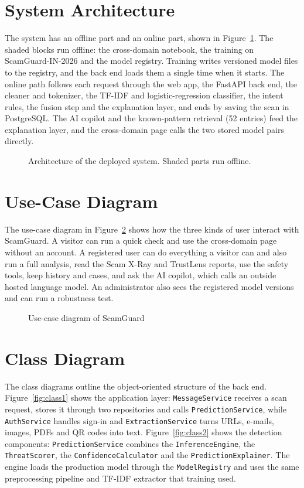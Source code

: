\section{System Architecture}
The system has an offline part and an online part, shown in Figure~\ref{fig:arch}. The shaded blocks run offline: the cross-domain notebook, the training on ScamGuard-IN-2026 and the model registry. Training writes versioned model files to the registry, and the back end loads them a single time when it starts. The online path follows each request through the web app, the FastAPI back end, the cleaner and tokenizer, the TF-IDF and logistic-regression classifier, the intent rules, the fusion step and the explanation layer, and ends by saving the scan in PostgreSQL. The AI copilot and the known-pattern retrieval (52 entries) feed the explanation layer, and the cross-domain page calls the two stored model pairs directly.

\begin{figure}[H]
\centering
\resizebox{\linewidth}{!}{}
\caption{Architecture of the deployed system. Shaded parts run offline.}
\label{fig:arch}
\end{figure}

\section{Use-Case Diagram}
The use-case diagram in Figure~\ref{fig:usecase} shows how the three kinds of user interact with ScamGuard. A visitor can run a quick check and use the cross-domain page without an account. A registered user can do everything a visitor can and also run a full analysis, read the Scam X-Ray and TrustLens reports, use the safety tools, keep history and cases, and ask the AI copilot, which calls an outside hosted language model. An administrator also sees the registered model versions and can run a robustness test.

\begin{figure}[H]
\centering
\resizebox{0.85\linewidth}{!}{}
\caption{Use-case diagram of ScamGuard}
\label{fig:usecase}
\end{figure}

\section{Class Diagram}
The class diagrams outline the object-oriented structure of the back end. Figure~\ref{fig:class1} shows the application layer: \texttt{MessageService} receives a scan request, stores it through two repositories and calls \texttt{PredictionService}, while \texttt{AuthService} handles sign-in and \texttt{ExtractionService} turns URLs, e-mails, images, PDFs and QR codes into text. Figure~\ref{fig:class2} shows the detection components: \texttt{PredictionService} combines the \texttt{InferenceEngine}, the \texttt{ThreatScorer}, the \texttt{ConfidenceCalculator} and the \texttt{PredictionExplainer}. The engine loads the production model through the \texttt{ModelRegistry} and uses the same preprocessing pipeline and TF-IDF extractor that training used.

